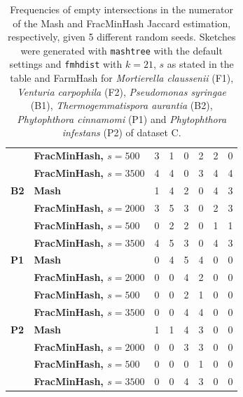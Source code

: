 \begin{table}[]
\begin{tabular}{@{}llrrrrrr@{}}
              & \textbf{FracMinHash, $s=500$}  & 3           & 1           & 0           & 2           & 2           & 0           \\
              & \textbf{FracMinHash, $s=3500$} & 4           & 4           & 0           & 3           & 4           & 4           \\ \midrule
  \textbf{B2} & \textbf{Mash}                  & 1           & 4           & 2           & 0           & 4           & 3           \\
  \textbf{}   & \textbf{FracMinHash, $s=2000$} & 3           & 5           & 3           & 0           & 2           & 3           \\
  \textbf{}   & \textbf{FracMinHash, $s=500$}  & 0           & 2           & 2           & 0           & 1           & 1           \\
  \textbf{}   & \textbf{FracMinHash, $s=3500$} & 4           & 5           & 3           & 0           & 4           & 3           \\ \midrule
  \textbf{P1} & \textbf{Mash}                  & 0           & 4           & 5           & 4           & 0           & 0           \\
  \textbf{}   & \textbf{FracMinHash, $s=2000$} & 0           & 0           & 4           & 2           & 0           & 0           \\
  \textbf{}   & \textbf{FracMinHash, $s=500$}  & 0           & 0           & 2           & 1           & 0           & 0           \\
  \textbf{}   & \textbf{FracMinHash, $s=3500$} & 0           & 0           & 4           & 4           & 0           & 0           \\ \midrule
  \textbf{P2} & \textbf{Mash}                  & 1           & 1           & 4           & 3           & 0           & 0           \\
  \textbf{}   & \textbf{FracMinHash, $s=2000$} & 0           & 0           & 3           & 3           & 0           & 0           \\
  \textbf{}   & \textbf{FracMinHash, $s=500$}  & 0           & 0           & 0           & 1           & 0           & 0           \\
              & \textbf{FracMinHash, $s=3500$} & 0           & 0           & 4           & 3           & 0           & 0           \\ \bottomrule
  \end{tabular}
  \caption{Frequencies of empty intersections in the numerator of the Mash and
  FracMinHash Jaccard estimation, respectively, given 5 different random seeds.
  Sketches were generated with \texttt{mashtree} with the default settings and
  \texttt{fmhdist} with $k=21$, $s$ as stated in the table and FarmHash for
  \textit{Mortierella claussenii} (F1), \textit{Venturia carpophila} (F2),
  \textit{Pseudomonas syringae} (B1), \textit{Thermogemmatispora aurantia} (B2),
  \textit{Phytophthora cinnamomi} (P1) and \textit{Phytophthora infestans} (P2)
  of dataset C.}
  \label{ta:avodadoIntersections}
\end{table}

